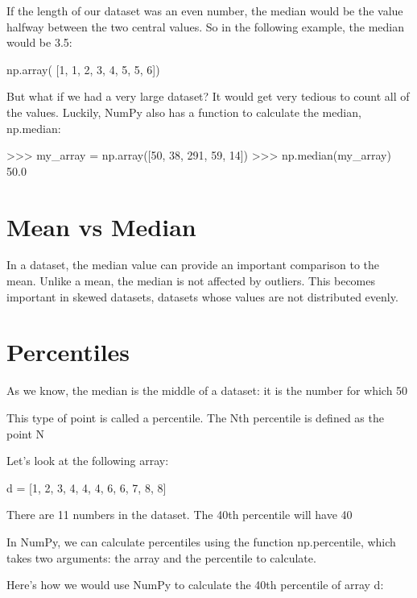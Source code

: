 \documentclass{journal}
\begin{document}
If the length of our dataset was an even number, the median would be the value halfway between the two central values. So in the following example, the median would be 3.5:

np.array( [1, 1, 2, 3, 4, 5, 5, 6])

But what if we had a very large dataset? It would get very tedious to count all of the values. Luckily, NumPy also has a function to calculate the median, np.median:

>>> my_array = np.array([50, 38, 291, 59, 14])
>>> np.median(my_array)
50.0

\section{Mean vs Median}
In a dataset, the median value can provide an important comparison to the mean. Unlike a mean, the median is not affected by outliers. This becomes important in skewed datasets, datasets whose values are not distributed evenly. 

\section{Percentiles}
As we know, the median is the middle of a dataset: it is the number for which 50%

This type of point is called a percentile. The Nth percentile is defined as the point N%

Let's look at the following array:

d = [1, 2, 3, 4, 4, 4, 6, 6, 7, 8, 8]

There are 11 numbers in the dataset. The 40th percentile will have 40%

In NumPy, we can calculate percentiles using the function np.percentile, which takes two arguments: the array and the percentile to calculate.

Here's how we would use NumPy to calculate the 40th percentile of array d:
\end{document}
